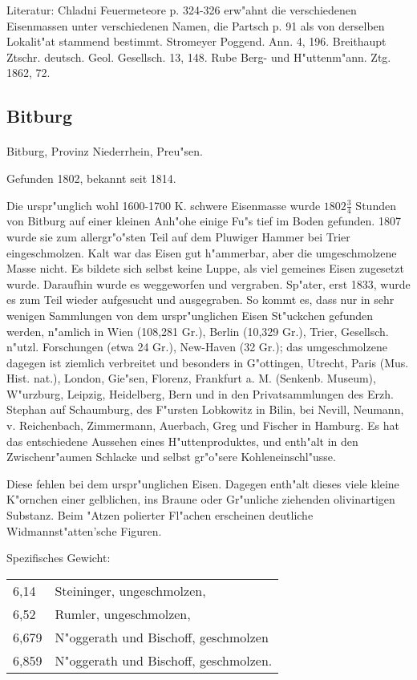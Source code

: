 \documentclass[a4paper, 11pt, oneside]{article}
\begin{document}
\footnotesize
Literatur: Chladni Feuermeteore p. 324-326 erw"ahnt die verschiedenen Eisenmassen unter verschiedenen Namen, die Partsch p. 91 als von derselben Lokalit"at stammend bestimmt. Stromeyer Poggend. Ann. 4, 196. Breithaupt Ztschr. deutsch. Geol. Gesellsch. 13, 148. Rube Berg- und H"uttenm"ann. Ztg. 1862, 72.

\subsection{Bitburg}
\normalsize
\paragraph{}
Bitburg, Provinz Niederrhein, Preu"sen.

Gefunden 1802, bekannt seit 1814.

Die urspr"unglich wohl 1600-1700 K. schwere Eisenmasse wurde $1802\frac{3}{4}$ Stunden von Bitburg auf einer kleinen Anh"ohe einige Fu"s tief im Boden gefunden. 1807 wurde sie zum allergr"o"sten Teil auf dem Pluwiger Hammer bei Trier eingeschmolzen. Kalt war das Eisen gut h"ammerbar, aber die umgeschmolzene Masse nicht. Es bildete sich selbst keine Luppe, als viel gemeines Eisen zugesetzt wurde. Daraufhin wurde es weggeworfen und vergraben. Sp"ater, erst 1833, wurde es zum Teil wieder aufgesucht und ausgegraben. So kommt es, dass nur in sehr wenigen Sammlungen von dem urspr"unglichen Eisen St"uckchen gefunden werden, n"amlich in Wien (108,281 Gr.), Berlin (10,329 Gr.), Trier, Gesellsch. n"utzl. Forschungen (etwa 24 Gr.), New-Haven (32 Gr.); das umgeschmolzene dagegen ist ziemlich verbreitet und besonders in G"ottingen, Utrecht, Paris (Mus. Hist. nat.), London, Gie"sen, Florenz, Frankfurt a. M. (Senkenb. Museum), W"urzburg, Leipzig, Heidelberg, Bern und in den Privatsammlungen des Erzh. Stephan auf Schaumburg, des F"ursten Lobkowitz in Bilin, bei Nevill, Neumann, v. Reichenbach, Zimmermann, Auerbach, Greg und Fischer in Hamburg. Es hat das entschiedene Aussehen eines H"uttenproduktes, und enth"alt in den Zwischenr"aumen Schlacke und selbst gr"o"sere Kohleneinschl"usse.

Diese fehlen bei dem urspr"unglichen Eisen. Dagegen enth"alt dieses viele kleine K"ornchen einer gelblichen, ins Braune oder Gr"unliche ziehenden olivinartigen Substanz. Beim "Atzen polierter Fl"achen erscheinen deutliche Widmannst"atten'sche Figuren.

Spezifisches Gewicht:  
\begin{table}[!ht]
    \centering
    \begin{tabular}{l l}
        6,14 & Steininger, ungeschmolzen,\\
        6,52 & Rumler, ungeschmolzen,\\
        6,679 & N"oggerath und Bischoff, geschmolzen\\
        6,859 & N"oggerath und Bischoff, geschmolzen.
    \end{tabular}
\end{table}
\end{document}
